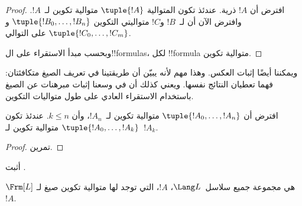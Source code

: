 \documentclass[../../../include/open-logic-section]{subfiles}
\begin{document}
\begin{proof}
افترض أن $!A$ ذرية. عندئذ تكون المتوالية $\tuple{!A}$ متوالية
تكوين لـ~$!A$.
%
وافترض الآن أن لـ~$!B$ و$!C$ متواليتي التكوين
$\tuple{!B_0,\dotsc,!B_n}$ و$\tuple{!C_0,\dotsc,!C_m}$ على
التوالي.
%
\begin{enumerate}
\end{enumerate}
وبحسب مبدأ الاستقراء على ال!!{formula}s، لكل !!{formula} متوالية
تكوين.
\end{proof}

ويمكننا أيضًا إثبات العكس. وهذا مهم لأنه يبيّن أن طريقتينا في تعريف
الصيغ متكافئتان: فهما تعطيان النتائج نفسها. ويعني كذلك أن في وسعنا
إثبات مبرهنات عن الصيغ باستخدام الاستقراء العادي على طول متواليات
التكوين.

\begin{lem}
افترض أن $\tuple{!A_0,\dotsc,!A_n}$ متوالية تكوين لـ~$!A_n$، وأن
$k \leq n$. عندئذ تكون $\tuple{!A_0,\dotsc,!A_k}$ متوالية تكوين
لـ~$!A_k$.
\end{lem}

\begin{proof}
تمرين.
\end{proof}

\begin{prob}
أثبت .
\end{prob}

\begin{thm}
$\Frm[L]$ هي مجموعة جميع سلاسل~$\Lang L$، $!A$، التي توجد لها
متوالية تكوين صيغ لـ~$!A$.
\end{thm}
\end{document}
